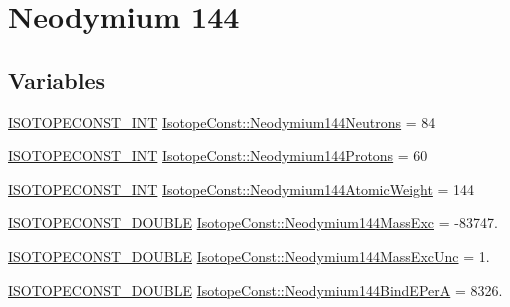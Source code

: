 \hypertarget{group___isotope_const-_neodymium-_nd144}{}\section{Neodymium 144}
\label{group___isotope_const-_neodymium-_nd144}
\subsection*{Variables}
\begin{DoxyCompactItemize}
\item 
\mbox{\hyperlink{group___isotope_const-_macros_ga5f18360b3e99483a35c32d789e62621c}{I\+S\+O\+T\+O\+P\+E\+C\+O\+N\+S\+T\+\_\+\+I\+NT}} \mbox{\hyperlink{group___isotope_const-_neodymium-_nd144_gadb7a2436e40bc8392635a1977e5b8914}{Isotope\+Const\+::\+Neodymium144\+Neutrons}} = 84
\item 
\mbox{\hyperlink{group___isotope_const-_macros_ga5f18360b3e99483a35c32d789e62621c}{I\+S\+O\+T\+O\+P\+E\+C\+O\+N\+S\+T\+\_\+\+I\+NT}} \mbox{\hyperlink{group___isotope_const-_neodymium-_nd144_gaccbb119f8b077cd55ed59323045ad7eb}{Isotope\+Const\+::\+Neodymium144\+Protons}} = 60
\item 
\mbox{\hyperlink{group___isotope_const-_macros_ga5f18360b3e99483a35c32d789e62621c}{I\+S\+O\+T\+O\+P\+E\+C\+O\+N\+S\+T\+\_\+\+I\+NT}} \mbox{\hyperlink{group___isotope_const-_neodymium-_nd144_ga80ee2978774d79c26e94ec46b06647fa}{Isotope\+Const\+::\+Neodymium144\+Atomic\+Weight}} = 144
\item 
\mbox{\hyperlink{group___isotope_const-_macros_ga8f45a7272ce02c0b4c65c44636ed719a}{I\+S\+O\+T\+O\+P\+E\+C\+O\+N\+S\+T\+\_\+\+D\+O\+U\+B\+LE}} \mbox{\hyperlink{group___isotope_const-_neodymium-_nd144_ga41817d72551f64ac74a2279709f37753}{Isotope\+Const\+::\+Neodymium144\+Mass\+Exc}} = -\/83747.
\item 
\mbox{\hyperlink{group___isotope_const-_macros_ga8f45a7272ce02c0b4c65c44636ed719a}{I\+S\+O\+T\+O\+P\+E\+C\+O\+N\+S\+T\+\_\+\+D\+O\+U\+B\+LE}} \mbox{\hyperlink{group___isotope_const-_neodymium-_nd144_gadc04c15e944f309d88af835179eb8081}{Isotope\+Const\+::\+Neodymium144\+Mass\+Exc\+Unc}} = 1.
\item 
\mbox{\hyperlink{group___isotope_const-_macros_ga8f45a7272ce02c0b4c65c44636ed719a}{I\+S\+O\+T\+O\+P\+E\+C\+O\+N\+S\+T\+\_\+\+D\+O\+U\+B\+LE}} \mbox{\hyperlink{group___isotope_const-_neodymium-_nd144_ga896dcdbd3382deed609f4ae29f6334e2}{Isotope\+Const\+::\+Neodymium144\+Bind\+E\+PerA}} = 8326.
\item 

\end{DoxyCompactItemize}
